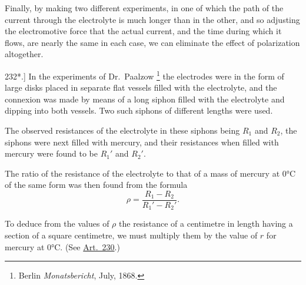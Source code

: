 \documentclass[12pt,oneside]{book}[2021/10/04]
\let\oldfootnote\footnote
\renewcommand\footnote[1]{%
\oldfootnote{\hspace{0.14em}#1}}
\newcommand{\article}[1]{\phantomsection \label{art:#1}{#1.]}}
\newcommand{\¬}{\hphantom{0}}
\begin{document}
Finally, by making two different experiments, in one of which
the path of the current through the electrolyte is much longer than
in the other, and so adjusting the electromotive force that the
actual current, and the time during which it flows, are nearly the
same in each case, we can eliminate the effect of polarization
altogether.

\article{232*} In the experiments of Dr.\ Paalzow\footnote{
Berlin \textit{Monatsbericht}, July, 1868.} the electrodes were
in the form of large disks placed in separate flat vessels filled with
the electrolyte, and the connexion was made by means of a long
siphon filled with the electrolyte and dipping into both vessels.
Two such siphons of different lengths were used.

The observed resistances of the electrolyte in these siphons
being \(R_1\) and \(R_2\), the siphons were next filled with mercury, and
their resistances when filled with mercury were found to be \({R_1}'\)
and \({R_2}'\).

The ratio of the resistance of the electrolyte to that of a mass
of mercury at 0°C of the same form was then found from the
formula
\[
  \rho = \frac{R_1 - R_2}{{R_1}' - {R_2}'}.
\]

To deduce from the values of \(\rho\) the resistance of a centimetre in
length having a section of a square centimetre, we must multiply
them by the value of \(r\) for mercury at 0°C. (See \hyperref[art:230*]{Art.\ 230}.)
\end{document}
